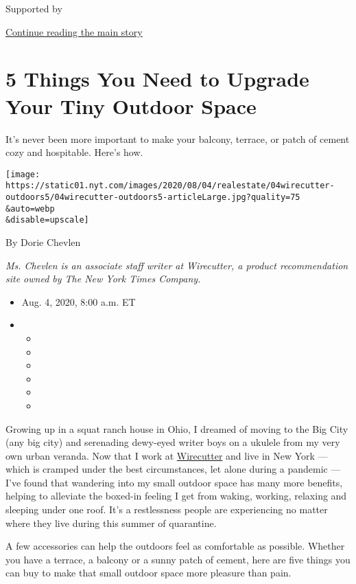 Supported by

\protect\hyperlink{after-sponsor}{Continue reading the main story}

\hypertarget{5-things-you-need-to-upgrade-your-tiny-outdoor-space}{%
\section{5 Things You Need to Upgrade Your Tiny Outdoor
Space}\label{5-things-you-need-to-upgrade-your-tiny-outdoor-space}}

It's never been more important to make your balcony, terrace, or patch
of cement cozy and hospitable. Here's how.

\texttt{[image: https://static01.nyt.com/images/2020/08/04/realestate/04wirecutter-outdoors5/04wirecutter-outdoors5-articleLarge.jpg?quality=75\\\&auto=webp\\\&disable=upscale]}

By Dorie Chevlen

\emph{Ms. Chevlen is an associate staff writer at Wirecutter, a product
recommendation site owned by The New York Times Company.}

\begin{itemize}
\item
  Aug. 4, 2020, 8:00 a.m. ET
\item
  \begin{itemize}
  \item
  \item
  \item
  \item
  \item
  \item
  \end{itemize}
\end{itemize}

Growing up in a squat ranch house in Ohio, I dreamed of moving to the
Big City (any big city) and serenading dewy-eyed writer boys on a
ukulele from my very own urban veranda. Now that I work at
\href{http://www.nytimes.com/wirecutter?utm_source=nytimes\&utm_medium=referral\&utm_campaign=outdoor-space}{Wirecutter}
and live in New York --- which is cramped under the best circumstances,
let alone during a pandemic --- I've found that wandering into my small
outdoor space has many more benefits, helping to alleviate the boxed-in
feeling I get from waking, working, relaxing and sleeping under one
roof. It's a restlessness people are experiencing no matter where they
live during this summer of quarantine.

A few accessories can help the outdoors feel as comfortable as possible.
Whether you have a terrace, a balcony or a sunny patch of cement, here
are five things you can buy to make that small outdoor space more
pleasure than pain.

